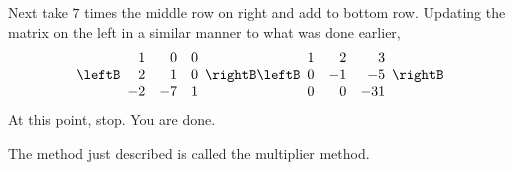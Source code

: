 \begin{solution}
Next take $7$ times the middle row on right and add to bottom row. Updating
the matrix on the left in a similar manner to what was done earlier, 
\begin{equation*}
\leftB 
\begin{array}{rrr}
1 & 0 & 0 \\ 
2 & 1 & 0 \\ 
-2 & -7 & 1
\end{array}
\rightB \leftB 
\begin{array}{rrr}
1 & 2 & 3 \\ 
0 & -1 & -5 \\ 
0 & 0 & -31
\end{array}
\rightB
\end{equation*}
At this point, stop. You are done. 
\end{solution}

The method just described is called the
multiplier method.
